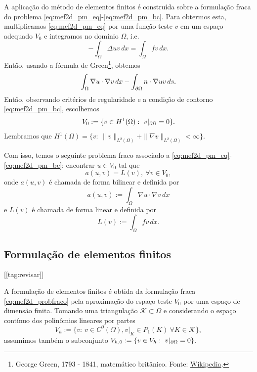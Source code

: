 A aplicação do método de elementos finitos é construída sobre a formulação fraca do problema \eqref{eq:mef2d_pm_eq}-\eqref{eq:mef2d_pm_bc}. Para obtermos esta, multiplicamos \eqref{eq:mef2d_pm_eq} por uma função teste $v$ em um espaço adequado $V_0$ e integramos no domínio $\Omega$, i.e.
\begin{equation}
  - \int_\Omega \Delta uv\,dx = \int_\Omega fv\,dx.
\end{equation}
Então, usando a fórmula de Green\footnote{George Green, 1793 - 1841, matemático britânico. Fonte: \href{https://en.wikipedia.org/wiki/George_Green_(mathematician)}{Wikipedia}.}, obtemos
\begin{equation}
  \int_\Omega \nabla u\cdot\nabla v\,dx - \int_{\partial\Omega} n\cdot\nabla uv\,ds.
\end{equation}
Então, observando critérios de regularidade e a condição de contorno \eqref{eq:mef2d_pm_bc}, escolhemos
\begin{equation}
  V_0 := \{v\in H^1(\Omega):~v|_{\partial\Omega}=0\}.
\end{equation}
Lembramos que $H^1(\Omega) = \{v:~\|v\|_{L^2(\Omega)}+\|\nabla v\|_{L^2(\Omega)}<\infty\}$.

Com isso, temos o seguinte problema fraco associado a \eqref{eq:mef2d_pm_eq}-\eqref{eq:mef2d_pm_bc}: encontrar $u\in V_0$ tal que
\begin{equation}\label{eq:mef2d_probfraco}
  a(u,v) = L(v),~\forall v\in V_0,
\end{equation}
onde $a(u, v)$ é chamada de forma bilinear e definida por
\begin{equation}
  a(u,v) := \int_\Omega \nabla u\cdot\nabla v\,dx
\end{equation}
e $L(v)$ é chamada de forma linear e definida por
\begin{equation}
  L(v) := \int_\Omega fv\,dx.
\end{equation}

\subsection{Formulação de elementos finitos}
[[tag:revisar]]


A formulação de elementos finitos é obtida da formulação fraca \eqref{eq:mef2d_probfraco} pela aproximação do espaço teste $V_0$ por uma espaço de dimensão finita. Tomando uma triangulação $\mathcal{K}\subset\Omega$ e considerando o espaço contínuo dos polinômios lineares por partes
\begin{equation}
  V_h := \{v:~v\in C^0(\Omega), v|_K\in P_1(K)~\forall K\in\mathcal{K}\},
\end{equation}
assumimos também o subconjunto $V_{h,0}:= \{v\in V_h:~v|_{\partial\Omega}=0\}$.


